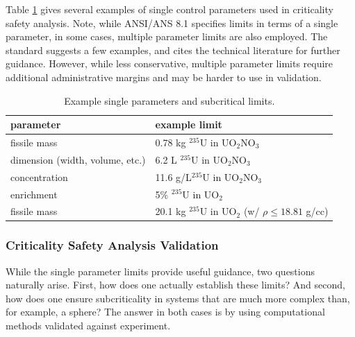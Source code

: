 Table \ref{tbl:controlparams} gives several examples of single control 
parameters used in criticality safety analysis.  Note, while ANSI/ANS 8.1 
specifies limits in terms of a single parameter, in some cases, multiple 
parameter limits are also employed.  The standard suggests a few examples, and
cites the technical literature for further guidance. However, while less 
conservative, multiple 
parameter limits require additional administrative margins and may be harder to 
use in validation.

\begin{table}[ht]
    \caption{Example single parameters and subcritical limits.}
    \begin{center} 
    \begin{tabular*}{0.90\textwidth}{@{\extracolsep{\fill}} ll } 
      \toprule 
	parameter &  example limit \\
      \midrule
       fissile mass                    &  0.78 kg ${}^{235}$U in UO$_2$NO$_3$ \\
       dimension (width, volume, etc.) &  6.2   L ${}^{235}$U in UO$_2$NO$_3$ \\
       concentration                   &  11.6 g/L${}^{235}$U in UO$_2$NO$_3$ \\
       enrichment                      &  5\%     ${}^{235}$U in UO$_2$       \\
       fissile mass                    &  20.1 kg ${}^{235}$U in UO$_2$ 
                                          (w/ $\rho \leq 18.81$ g/cc) \\
      \bottomrule 
    \end{tabular*} 
    \end{center} 
    \label{tbl:controlparams}
\end{table}



\subsubsection*{Criticality Safety Analysis Validation}

While the single parameter limits provide useful guidance, two questions 
naturally arise.  First, how does one actually establish these limits?  And 
second, how does one ensure subcriticality in systems that are much more 
complex than, for example, a sphere?  The answer in both cases is by using 
computational methods validated against experiment.

